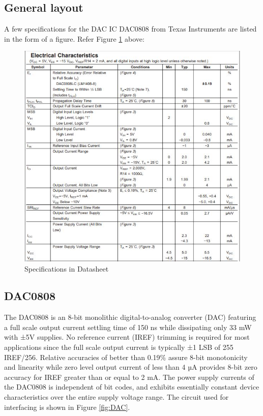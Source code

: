 \documentclass[12pt, letterpaper]{article}
\begin{document}
\subsection{General layout}
A few specifications for the DAC IC DAC0808 from Texas Instruments are listed in the form of a figure. Refer Figure \ref{fig:specs} above:
\begin{figure}[t]
	\centering
	\includegraphics[scale=0.75]{Datasheet_DAC0808.JPG}
	\caption{Specifications in Datasheet}
	\label{fig:specs}
\end{figure}

\subsection{DAC0808}

The DAC0808 is an 8-bit monolithic digital-to-analog converter (DAC) featuring a full scale output current settling time of 150 ns while dissipating only 33 mW with ±5V supplies. No reference current (IREF) trimming is required for most applications since the full scale output current is typically ±1 LSB of 255 IREF/256. Relative accuracies of better than 0.19\% assure 8-bit monotonicity and linearity while zero level output current of less than 4 µA provides 8-bit zero accuracy for IREF greater than or equal to 2 mA. The power supply currents of the DAC0808 is independent of bit codes, and exhibits essentially constant device characteristics over the entire supply voltage range. The circuit used for interfacing is shown in Figure \ref{fig:DAC}.
\end{document}
